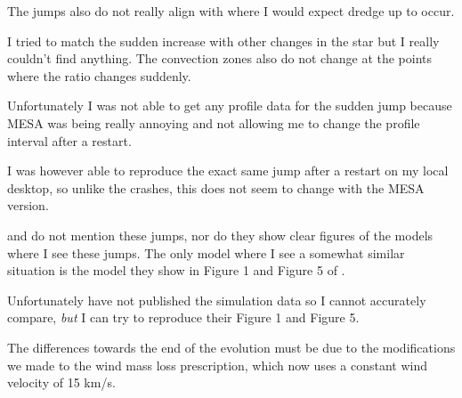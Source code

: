\documentclass[a4paper,10pt]{article}
\begin{document}
\begin{figure}[ht]
    \centering
\end{figure}

The jumps also do not really align with where I would expect dredge up to occur. 

I tried to match the sudden increase with other changes in the star but I really couldn't find anything. The convection zones also do not change at the points where the ratio changes suddenly.

Unfortunately I was not able to get any profile data for the sudden jump because MESA was being really annoying and not allowing me to change the profile interval after a restart.

I was however able to reproduce the exact same jump after a restart on my local desktop, so unlike the crashes, this does not seem to change with the MESA version.

\citet{rees2024b} and \citet{rees2024a} do not mention these jumps, nor do they show clear figures of the models where I see these jumps. The only model where I see a somewhat similar situation is the model they show in Figure 1 and Figure 5 of \citet{rees2024a}.

Unfortunately \citet{rees2024b} have not published the simulation data so I cannot accurately compare, \emph{but} I can try to reproduce their Figure 1 and Figure 5. 

\begin{figure}[ht]
    \centering
\end{figure}

The differences towards the end of the evolution must be due to the modifications we made to the wind mass loss prescription, which now uses a constant wind velocity of 15 km/s.

\begin{figure}[ht]
    \centering
\end{figure}
\end{document}
